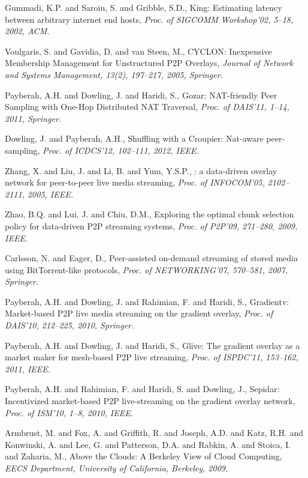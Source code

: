 {\begin{thebibliography}{5}
Gummadi, K.P. and Saroiu, S. and Gribble, S.D.,
\newblock King: Estimating latency between arbitrary internet end hosts,
\newblock \emph{Proc. of SIGCOMM Workshop'02, 5--18, 2002, ACM.}

Voulgaris, S. and Gavidia, D. and van Steen, M.,
\newblock CYCLON: Inexpensive Membership Management for Unstructured {P2P} Overlays,
\newblock \emph{Journal of Network and Systems Management, 13(2), 197--217, 2005, Springer.}

Payberah, A.H. and Dowling, J. and Haridi, S.,
\newblock Gozar: {NAT}-friendly Peer Sampling with One-Hop Distributed {NAT} Traversal,
\newblock \emph{Proc. of DAIS'11, 1--14, 2011, Springer.}

Dowling, J. and Payberah, A.H.,
\newblock Shuffling with a {Croupier}: Nat-aware peer-sampling,
\newblock \emph{Proc. of ICDCS'12, 102--111, 2012, IEEE.}

Zhang, X. and Liu, J. and Li, B. and Yum, Y.S.P.,
: a data-driven overlay network for peer-to-peer live media streaming,
\newblock \emph{Proc. of INFOCOM'05, 2102--2111, 2005, IEEE.}

Zhao, B.Q. and Lui, J. and Chiu, D.M.,
\newblock Exploring the optimal chunk selection policy for data-driven {P2P} streaming systems,
\newblock \emph{Proc. of P2P'09, 271--280, 2009, IEEE.}

Carlsson, N. and Eager, D.,
\newblock Peer-assisted on-demand streaming of stored media using BitTorrent-like protocols,
\newblock \emph{Proc. of NETWORKING'07, 570--581, 2007, Springer.}

Payberah, A.H. and Dowling, J. and Rahimian, F. and Haridi, S.,
\newblock Gradientv: Market-based {P2P} live media streaming on the gradient overlay,
\newblock \emph{Proc. of DAIS'10, 212--225, 2010, Springer.}

Payberah, A.H. and Dowling, J. and Haridi, S.,
\newblock Glive: The gradient overlay as a market maker for mesh-based {P2P} live streaming,
\newblock \emph{Proc. of ISPDC'11, 153--162, 2011, IEEE.}

Payberah, A.H. and Rahimian, F. and Haridi, S. and Dowling, J.,
\newblock Sepidar: Incentivized market-based {P2P} live-streaming on the gradient overlay network,
\newblock \emph{Proc. of ISM'10, 1--8, 2010, IEEE.}

Armbrust, M. and Fox, A. and Griffith, R. and Joseph, A.D. and Katz, R.H. and Konwinski, A. and Lee, G. and Patterson, D.A. and Rabkin, A. and Stoica, I. and Zaharia, M.,
\newblock Above the Clouds: A Berkeley View of Cloud Computing,
\newblock \emph{EECS Department, University of California, Berkeley, 2009.}


\end{thebibliography}}
